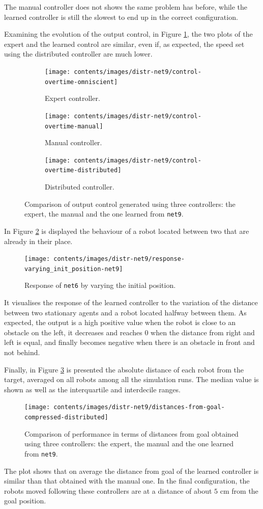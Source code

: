 \noindent
The manual controller does not shows the same problem has before, while the 
learned controller is still the slowest to end up in the correct configuration.

Examining the evolution of the output control, in Figure \ref{fig:net9control}, 
the two plots of the expert and the learned control are similar, even if, as 
expected, the speed set using the distributed controller are much lower.
\begin{figure}[!htb]
	\centering
	\begin{subfigure}[h]{0.3\textwidth}
		\centering
		\texttt{[image: contents/images/distr-net9/control-overtime-omniscient]}%
		\caption{Expert controller.}
	\end{subfigure}
	\hfill
	\begin{subfigure}[h]{0.3\textwidth}
		\centering
		\texttt{[image: contents/images/distr-net9/control-overtime-manual]}%
		\caption{Manual controller.}
	\end{subfigure}
	\hfill
	\begin{subfigure}[h]{0.3\textwidth}
		\centering
		\texttt{[image: contents/images/distr-net9/control-overtime-distributed]}
		\caption{Distributed controller.}
	\end{subfigure}
	\caption[Evaluation of the control learned by \texttt{net9}.]{Comparison 
		of output control generated using three controllers: the expert, the manual 
		and the one learned from \texttt{net9}.}
	\label{fig:net9control}
\end{figure}

In Figure \ref{fig:net9responseposition} is displayed the behaviour of a robot 
located between two that are already in their place.
\begin{figure}[!htb]
	\centering
\texttt{[image: contents/images/distr-net9/response-varying\_init\_position-net9]}%
	\caption{Response of \texttt{net6} by varying the initial position.}
	\label{fig:net9responseposition}
\end{figure}
It visualises the response of the learned controller to the variation of the 
distance between two stationary agents and a robot located halfway between 
them.
As expected, the output is a high positive value when the robot is close to an 
obstacle on the left, it decreases and reaches $0$ when the distance from 
right and left is equal, and finally becomes negative when there is an obstacle in 
front and not behind. 

Finally, in Figure \ref{fig:net9distance} is presented the absolute distance of each 
robot from the target, averaged on all robots among all the simulation runs.  The 
median value is shown as well as the interquartile and interdecile 
ranges.
\begin{figure}[!htb]
	\centering
	\texttt{[image: contents/images/distr-net9/distances-from-goal-compressed-distributed]}%
	\caption[Evaluation of \texttt{net9} distances from goal.]{Comparison of 
		performance in terms of distances from goal obtained using three 
		controllers: the expert, the manual and the one learned from \texttt{net9}.}
	\label{fig:net9distance}
\end{figure}

The plot shows that on average the distance from goal of the learned controller is 
similar than that obtained with the manual one. In the final configuration, the 
robots moved following these controllers are at a distance of about $5$ \gls{cm} 
from the goal position. 

